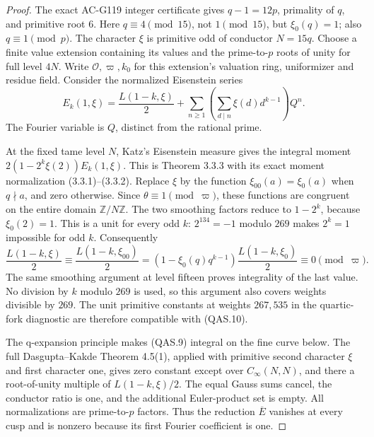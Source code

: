 \begin{proof}
The exact AC-G119 integer certificate gives
\(q-1=12p\), primality of \(q\), and primitive root \(6\).
Here \(q\equiv4\pmod{15}\), not \(1\pmod{15}\), but
\(\xi_0(q)=1\); also \(q\equiv1\pmod p\).
The character \(\xi\) is primitive odd of conductor \(N=15q\).
Choose a finite value extension containing its values and the
prime-to-\(p\) roots of unity for full level \(4N\).
Write \(\mathcal O,\varpi,k_0\) for this extension's valuation
ring, uniformizer and residue field.  Consider the normalized
Eisenstein series
\[
 E_k(1,\xi)=\frac{L(1-k,\xi)}2+
       \sum_{n\ge1}\left(\sum_{d\mid n}\xi(d)d^{k-1}\right)Q^n.
 \tag{QAS.9}
\]
The Fourier variable is \(Q\), distinct from the rational prime.

At the fixed tame level \(N\), Katz's Eisenstein measure gives
the integral moment \(2(1-2^k\xi(2))E_k(1,\xi)\).
This is Theorem 3.3.3 with its exact moment normalization
(3.3.1)--(3.3.2).  Replace \(\xi\) by the function
\(\xi_{00}(a)=\xi_0(a)\) when \(q\nmid a\), and zero otherwise.
Since \(\theta\equiv1\pmod\varpi\), these functions are
congruent on the entire domain \(\mathbb Z/N\mathbb Z\).
The two smoothing factors reduce to \(1-2^k\), because
\(\xi_0(2)=1\).  This is a unit for every odd \(k\):
\(2^{134}=-1\) modulo \(269\) makes \(2^k=1\) impossible
for odd \(k\).  Consequently
\[
 \frac{L(1-k,\xi)}2\equiv
 \frac{L(1-k,\xi_{00})}2
  =(1-\xi_0(q)q^{k-1})\frac{L(1-k,\xi_0)}2
  \equiv0\pmod\varpi.
 \tag{QAS.10}
\]
The same smoothing argument at level fifteen proves integrality
of the last value.  No division by \(k\) modulo \(269\) is used,
so this argument also covers weights divisible by \(269\).
The unit primitive constants at weights \(267,535\) in the
quartic-fork diagnostic are therefore compatible with (QAS.10).

The q-expansion principle makes (QAS.9) integral on the fine
curve below.  The full Dasgupta--Kakde Theorem 4.5(1), applied
with primitive second character \(\xi\) and first character one,
gives zero constant except over \(C_\infty(N,N)\), and there a
root-of-unity multiple of \(L(1-k,\xi)/2\).
The equal Gauss sums cancel, the conductor ratio is one, and
the additional Euler-product set is empty.
All normalizations are prime-to-\(p\) factors.
Thus the reduction \(\overline E\) vanishes at every cusp and
is nonzero because its first Fourier coefficient is one.


\end{proof}
